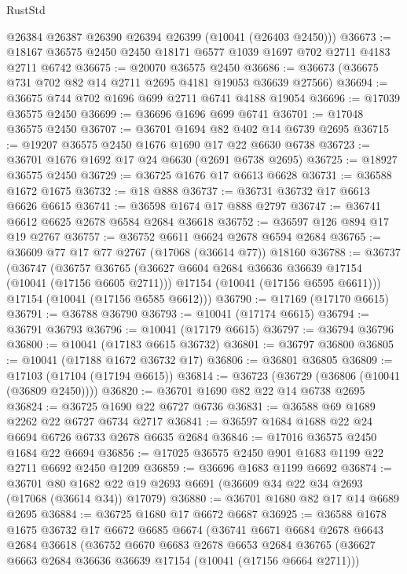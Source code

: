 \begin{lexlean}{RustStd}
\begin{coremodule}
      @26384
      @26387
      @26390
      @26394
      @26399
      (@10041 (@26403 @2450)))
@36673 := @18167 @36575 @2450 @2450 @18171 @6577 @1039 @1697 @702 @2711 @4183 @2711 @6742
@36675 := @20070 @36575 @2450
@36686 := @36673 (@36675 @731 @702 @82 @14 @2711 @2695 @4181 @19053 @36639 @27566)
@36694 := @36675 @744 @702 @1696 @699 @2711 @6741 @4188 @19054
@36696 := @17039 @36575 @2450
@36699 := @36696 @1696 @699 @6741
@36701 := @17048 @36575 @2450
@36707 := @36701 @1694 @82 @402 @14 @6739 @2695
@36715 := @19207 @36575 @2450 @1676 @1690 @17 @22 @6630 @6738
@36723 := @36701 @1676 @1692 @17 @24 @6630 (@2691 @6738 @2695)
@36725 := @18927 @36575 @2450
@36729 := @36725 @1676 @17 @6613 @6628
@36731 := @36588 @1672 @1675
@36732 := @18 @888
@36737 := @36731 @36732 @17 @6613 @6626 @6615
@36741 := @36598 @1674 @17 @888 @2797
@36747 := @36741 @6612 @6625 @2678 @6584 @2684 @36618
@36752 := @36597 @126 @894 @17 @19 @2767
@36757 := @36752 @6611 @6624 @2678 @6594 @2684
@36765 := @36609 @77 @17 @77 @2767 (@17068 (@36614 @77)) @18160
@36788 := @36737
    (@36747
      (@36757
        @36765
        (@36627 @6604 @2684 @36636 @36639 @17154 (@10041 (@17156 @6605 @2711)))
        @17154
        (@10041 (@17156 @6595 @6611)))
      @17154
      (@10041 (@17156 @6585 @6612)))
@36790 := @17169 (@17170 @6615)
@36791 := @36788 @36790
@36793 := @10041 (@17174 @6615)
@36794 := @36791 @36793
@36796 := @10041 (@17179 @6615)
@36797 := @36794 @36796
@36800 := @10041 (@17183 @6615 @36732)
@36801 := @36797 @36800
@36805 := @10041 (@17188 @1672 @36732 @17)
@36806 := @36801 @36805
@36809 := @17103 (@17104 (@17194 @6615))
@36814 := @36723 (@36729 (@36806 (@10041 (@36809 @2450))))
@36820 := @36701 @1690 @82 @22 @14 @6738 @2695
@36824 := @36725 @1690 @22 @6727 @6736
@36831 := @36588 @69 @1689 @2262 @22 @6727 @6734 @2717
@36841 := @36597 @1684 @1688 @22 @24 @6694 @6726 @6733 @2678 @6635 @2684
@36846 := @17016 @36575 @2450 @1684 @22 @6694
@36856 := @17025 @36575 @2450 @901 @1683 @1199 @22 @2711 @6692 @2450 @1209
@36859 := @36696 @1683 @1199 @6692
@36874 := @36701
    @80
    @1682
    @22
    @19
    @2693
    @6691
    (@36609 @34 @22 @34 @2693 (@17068 (@36614 @34)) @17079)
@36880 := @36701 @1680 @82 @17 @14 @6689 @2695
@36884 := @36725 @1680 @17 @6672 @6687
@36925 := @36588
    @1678
    @1675
    @36732
    @17
    @6672
    @6685
    @6674
    (@36741
      @6671
      @6684
      @2678
      @6643
      @2684
      @36618
      (@36752
        @6670
        @6683
        @2678
        @6653
        @2684
        @36765
        (@36627 @6663 @2684 @36636 @36639 @17154 (@10041 (@17156 @6664 @2711)))

\end{coremodule}
\end{lexlean}
